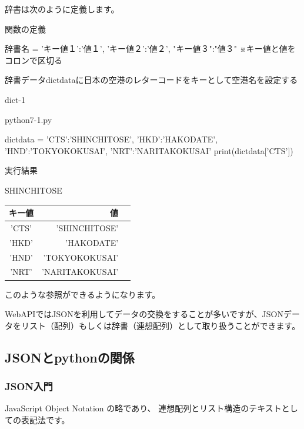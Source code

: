 \documentclass[11pt,a4paper,dvipdfmx,titlepage]{jsreport}
\begin{document}
辞書は次のように定義します。
\begin{grabox}{関数の定義}
\begin{listing}{1}
辞書名 = {'キー値１':'値１', 'キー値２':'値２', "キー値３":"値３"}
※キー値と値をコロンで区切る
\end{listing}
\end{grabox}
辞書データdictdataに日本の空港のレターコードをキーとして空港名を設定する
\begin{pabox}{dict-1}
\begin{codebox}{python7-1.py}
\begin{listing}{1}
dictdata = {'CTS':'SHINCHITOSE', 'HKD':'HAKODATE', 
    'HND':'TOKYOKOKUSAI', 'NRT':'NARITAKOKUSAI' }
print(dictdata['CTS'])
   
\end{listing}

実行結果
\begin{listing}{1}
SHINCHITOSE
\end{listing}
\end{codebox}
\end{pabox}

\begin{center}
\begin{tabular}{|c|r|r|} 
\hline
 キー値& 値 \\ \hline \hline
 'CTS' &  'SHINCHITOSE' \\ \hline
 'HKD' &  'HAKODATE' \\ \hline
 'HND' &  'TOKYOKOKUSAI' \\ \hline
 'NRT' &  'NARITAKOKUSAI' \\ \hline
\end{tabular}
\end{center}

このような参照ができるようになります。

WebAPIではJSONを利用してデータの交換をすることが多いですが、JSONデータをリスト（配列）もしくは辞書（連想配列）として取り扱うことができます。

\subsection{JSONとpythonの関係}

\subsubsection{JSON入門}
JavaScript Object Notation の略であり、
連想配列とリスト構造のテキストとしての表記法です。
\end{document}
